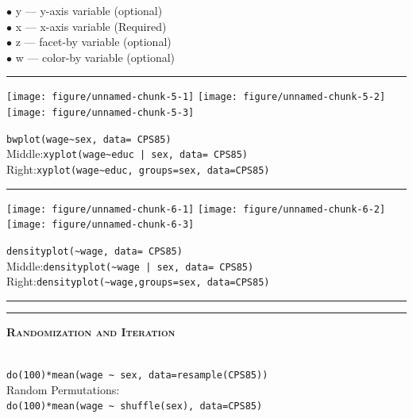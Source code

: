 \documentclass{article}\usepackage[]{graphicx}\usepackage[]{color}
\newenvironment{knitrout}{}{} %
\newcommand{\NewSection}[1]{{\noindent\color{blue}\bfseries\scshape#1}}
\begin{document}
\noindent$\bullet$ {\sf y} --- y-axis variable ({\sc optional})\\
$\bullet$ {\sf x} --- x-axis variable ({\sc\color{blue}Required})\\
$\bullet$ {\sf z} --- facet-by variable ({\sc optional})\\
$\bullet$ {\sf w} --- color-by variable ({\sc optional})\\
\vspace*{-2mm}
\hrule
\noindent%
\hspace*{-2mm}%
\begin{knitrout}
\color{fgcolor}
\texttt{[image: figure/unnamed-chunk-5-1]} 
\texttt{[image: figure/unnamed-chunk-5-2]} 
\texttt{[image: figure/unnamed-chunk-5-3]} 

\end{knitrout}
\begin{small}
\hfill\verb+bwplot(wage~sex, data= CPS85)+\\
{\tiny \sc Middle:}\hfill\verb+xyplot(wage~educ | sex, data= CPS85)+\\
{\tiny \sc Right:}\hfill\verb+xyplot(wage~educ, groups=sex, data=CPS85)+\\
\end{small}
\hrule%
\noindent\hspace*{-2mm}%
\begin{knitrout}
\color{fgcolor}
\texttt{[image: figure/unnamed-chunk-6-1]} 
\texttt{[image: figure/unnamed-chunk-6-2]} 
\texttt{[image: figure/unnamed-chunk-6-3]} 

\end{knitrout}
\begin{small}
\hfill\verb+densityplot(~wage, data= CPS85)+\\
{\tiny \sc Middle:}\hfill\verb+densityplot(~wage | sex, data= CPS85)+\\
{\tiny \sc Right:}\hfill\verb+densityplot(~wage,groups=sex, data=CPS85)+\\
\end{small}
\hrule
\hrule
\vspace*{2mm}
\NewSection{Randomization and Iteration}\\
\begin{small}
\\
\verb+do(100)*mean(wage ~ sex, data=resample(CPS85))+\\
{\sc Random Permutations:}\\
\verb+do(100)*mean(wage ~ shuffle(sex), data=CPS85)+\\
\end{small}
\end{document}

